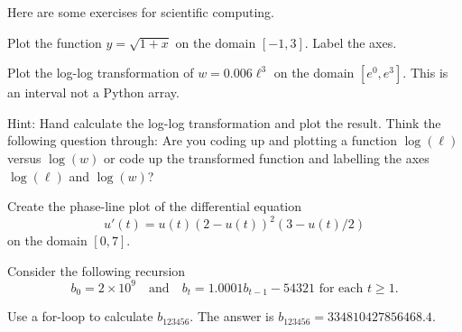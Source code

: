 \documentclass[../main.tex]{subfiles}
\begin{document}
Here are some exercises for scientific computing.
\begin{computing}
  Plot the function \(y = \sqrt{1 + x}\) on the domain \([-1,3]\). Label the axes.
\end{computing}

\begin{computing}
  Plot the log-log transformation of \(w = 0.006 \ell^{3}\) on the domain \([e^{0}, e^{3}]\). This is an interval not a Python array.

  Hint: Hand calculate the log-log transformation and plot the result.  Think the following question through: Are you coding up and plotting a function \(\log(\ell)\) versus \(\log(w)\) or code up the transformed function and labelling the axes \(\log(\ell)\) and \(\log(w)\)?

\end{computing}

\begin{computing}
  Create the phase-line plot of the differential equation 
  \[
    u'(t) = u(t) (2 - u(t))^{2}(3 - u(t)/2)
  \]
  on the domain \([0, 7]\).
\end{computing}


\begin{computing}
  Consider the following recursion
  \[
    b_{0} = 2 \times 10^{9} \quad\text{and}\quad b_{t} = 1.0001 b_{t-1} - 54321 \text{ for each } t \ge 1.
  \]

  Use a for-loop to calculate \(b_{123456}\).  The answer is \(b_{123456} = 334810427856468.4\).
\end{computing}
\clearpage
\end{document}
